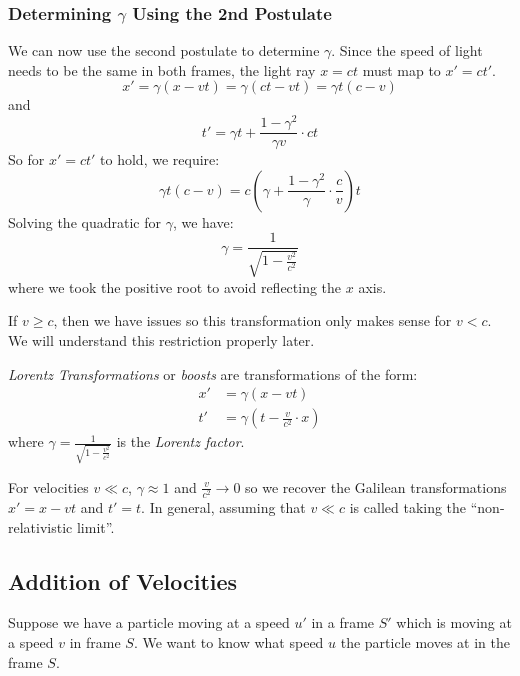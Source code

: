 \documentclass[../main.tex]{subfiles}
\begin{document}
\subsubsection{Determining $\gamma$ Using the 2nd Postulate}
We can now use the second postulate to determine $\gamma$.
Since the speed of light needs to be the same in both frames, the light ray $x = ct$ must map to $x' = ct'$.
\[
  x' = \gamma(x - vt) = \gamma(ct - vt) = \gamma t(c - v)
\]
and
\[
  t' = \gamma t + \frac{1 - \gamma^2}{\gamma v} \cdot ct
\]
So for $x' = ct'$ to hold, we require:
\[
  \gamma t(c - v) = c\left(\gamma + \frac{1 - \gamma^2}{\gamma} \cdot \frac{c}{v}\right)t
\]
Solving the quadratic for $\gamma$, we have:
\[
  \gamma = \frac{1}{\sqrt{1 - \frac{v^2}{c^2}}}
\]
where we took the positive root to avoid reflecting the $x$ axis.
\begin{remark}
  If $v \geq c$, then we have issues so this transformation only makes sense for $v < c$.
  We will understand this restriction properly later.
\end{remark}
\begin{definition}
  \textit{Lorentz Transformations} or \textit{boosts} are transformations of the form:
  \label{lorentzTransforms}
  \begin{align*}
    x' &= \gamma(x - vt) \\
    t' &= \gamma\left(t - \frac{v}{c^2} \cdot x\right)
  \end{align*}
  where $\gamma = \frac{1}{\sqrt{1 - \frac{v^2}{c^2}}}$ is the \textit{Lorentz factor}.
\end{definition}
\begin{remark}
  For velocities $v \ll c$, $\gamma \approx 1$ and $\frac{v}{c^2} \to 0$ so we recover the Galilean transformations $x' = x - vt$ and $t' = t$.
  In general, assuming that $v \ll c$ is called taking the ``non-relativistic limit''.
\end{remark}
\subsection{Addition of Velocities}
\label{additionOfVelocities}
Suppose we have a particle moving at a speed $u'$ in a frame $S'$ which is moving at a speed $v$ in frame $S$.
We want to know what speed $u$ the particle moves at in the frame $S$.
\end{document}
